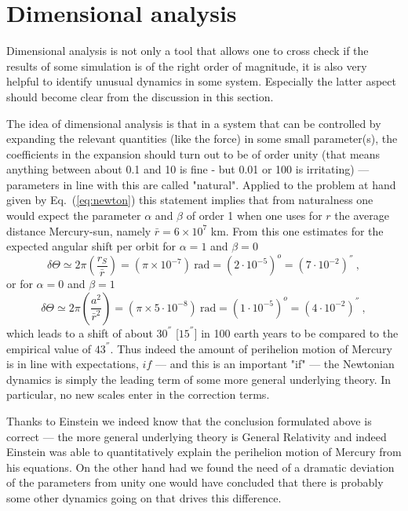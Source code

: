 \documentclass[12pt,ngerman,american]{iopart}
\begin{document}
\section{Dimensional analysis}\label{sec:analysis}

Dimensional analysis is not only a tool that allows one to cross check if the results of some simulation is of the right order of magnitude, it is also very helpful to identify unusual dynamics in some system.
Especially the latter aspect should become clear from the discussion in this section.

The idea of dimensional analysis is that in a system that can be controlled by expanding the relevant quantities (like the force) in some small parameter(s), the coefficients in the expansion should turn out to be of order unity (that means anything between about 0.1 and 10 is fine - but 0.01 or 100 is irritating) --- parameters in line with this are called "natural".
Applied to the problem at hand given by Eq.~(\ref{eq:newton}) this statement implies that from naturalness one would expect the parameter $\alpha$ and $\beta$  of order 1
 when one uses for $r$ the average distance Mercury-sun, namely $\bar r=6\times 10^7$ km.
From this one estimates for the expected angular shift per orbit for $\alpha=1$ and $\beta=0$
\begin{equation}
\delta \Theta \simeq 2\pi\left(\frac{r_S}{\bar r}\right) = (\pi \times 10^{-7}) \ \mbox{rad} = (2\cdot 10^{-5})^o = (7\cdot 10^{-2}) ^{''} \ ,
\end{equation}
or for $\alpha=0$ and $\beta=1$
\begin{equation}
\delta \Theta \simeq 2\pi\left(\frac{a^2}{\bar r^2}\right) = (\pi \times 5 \cdot 10^{-8}) \ \mbox{rad} = (1 \cdot 10^{-5})^o = (4\cdot 10^{-2}) ^{''} \ ,
\end{equation}
which leads to a shift of about $30^{''}$ [$15^{''}$] in 100 earth years to be compared to the empirical value of $43^{''}$.
Thus indeed the amount of perihelion motion of Mercury is in line with expectations, $if$ --- and this is an important "if" --- the Newtonian dynamics is simply the leading term of some more general underlying theory.
In particular, no new scales enter in the correction terms.

Thanks to Einstein we indeed know that the conclusion formulated above is correct --- the more general underlying theory is General Relativity and indeed Einstein was able to quantitatively explain the perihelion motion of Mercury from his equations.
On the other hand had we found the need of
 a dramatic deviation of the parameters from unity one would have concluded that there is probably some other dynamics going on that drives this difference.
\end{document}
